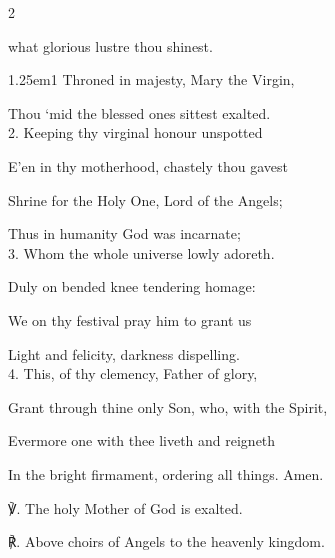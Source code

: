 
\firstEvensong
{}

\begin{multicols}{2}
\sloppy

 what glorious lustre thou shinest.


\begin{hangparas}{1.25em}{1}
Throned in majesty, Mary the Virgin,

Thou `mid the blessed ones sittest exalted.\\

2. Keeping thy virginal honour unspotted

E'en in thy motherhood, chastely thou gavest

Shrine for the Holy One, Lord of the Angels;

Thus in humanity God was incarnate;\\

3. Whom the whole universe lowly adoreth.

Duly on bended knee tendering homage:

We on thy festival pray him to grant us

Light and felicity, darkness dispelling.\\

4. This, of thy clemency, Father of glory,

Grant through thine only Son, who, with the Spirit,

Evermore one with thee liveth and reigneth

In the bright firmament, ordering all things. Amen.\\
\end{hangparas}

℣. The holy Mother of God is exalted.

℟. Above choirs of Angels to the heavenly kingdom.


\fussy	
\end{multicols}


